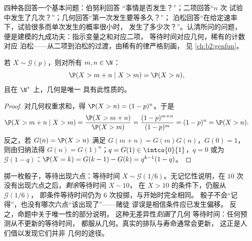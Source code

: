 \begin{remark}[各分布分别刻画什么]
四种各回答一个基本问题：伯努利回答
“事情是否发生？”；二项回答“$n$ 次
试验中发生了几次？”；几何回答“第一次发生要等多久？”；
泊松回答“在给定速率下，试验很多而单次发生的概率很小时，
发生了多少次？”。认清所问的问题，
便是建模的九成功夫：指示变量之和对应二项，
等待时间对应几何，稀有的计数对应
泊松——从二项到泊松的过渡，由稀有的律严格刻画，
见
\cref{ch:b2:genfun}。
\end{remark}

\begin{proposition}[几何
分布的无记忆性]\label{prop:b2:randomvar:memoryless}
若 $X \sim \mathcal{G}(p)$，则对所有 $m, n \in \N$：
\[
\P(X > m + n \mid X > m) = \P(X > n) ,
\]
且在 $\N^*$ 上，几何是唯一
具有此性质的。
\end{proposition}

\begin{proof}
对几何权重求和，得 $\P(X > n) = (1-p)^n$。于是
\[
\P(X > m + n \mid X > m)
= \frac{\P(X > m + n)}{\P(X > m)}
= \frac{(1-p)^{m+n}}{(1-p)^m} = (1-p)^n = \P(X > n).
\]
反之，若 $G(n) = \P(X > n)$ 满足 $G(m + n) =
G(m)G(n)$，$G(0) = 1$，则由归纳法得 $G(n) = G(1)^n$；$q =
G(1) \in \intco{0}{1}$，$q = 0$ 或为
$\mathcal{G}(1 - q)$：$\P(X = k) = G(k-1) - G(k) =
q^{k-1}(1 - q)$。
\end{proof}

\begin{example}
掷一枚骰子，等待出现六点：等待时间 $X \sim
\mathcal G(1/6)$。无记忆性说明，在 $10$ 次
没有出现六点之后，\emph{剩余}等待时间 $X - 10$，
在 $X > 10$ 的条件下，仍服从 $\mathcal G(1/6)$，
即条件等待时间仍为 $6$ 次投掷，与开始时完全相同。
骰子不会“记得”，也没有哪次六点“该出现了”——赌徒
谬误是相信条件应已发生偏移。
反之，命题中关于唯一性的部分说明，
这种无差异性\emph{刻画}了几何
等待时间：任何预测从不更新的等待时间，
都服从几何。真实的排队与寿命通常会更新，
这正是人们借以发现它们并非
几何的途径。
\end{example}

